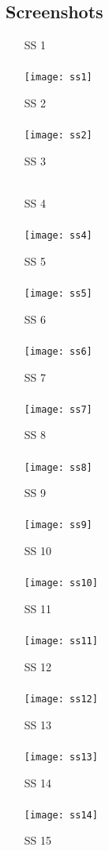 \documentclass[a4paper, 12pt, titlepage]{article}
\begin{document}
\subsection{Screenshots}
\begin{enumerate}
	\item[SS]1\\\\
		\texttt{[image: ss1]}
	\item[SS]2\\\\
		\texttt{[image: ss2]}
	\item[SS]3\\\\
	\item[SS]4\\\\ 
		\texttt{[image: ss4]}
	\item[SS]5\\\\ 
		\texttt{[image: ss5]}
	\item[SS]6\\\\
		\texttt{[image: ss6]}
	\item[SS]7\\\\ 
		\texttt{[image: ss7]}
	\item[SS]8\\\\ 
		\texttt{[image: ss8]}
	\item[SS]9\\\\ 
		\texttt{[image: ss9]}
	\item[SS]10\\\\ 
		\texttt{[image: ss10]}
	\item[SS]11\\\\ 
		\texttt{[image: ss11]}
	\item[SS]12\\\\ 
		\texttt{[image: ss12]}
	\item[SS]13\\\\ 
		\texttt{[image: ss13]}
	\item[SS]14\\\\ 
		\texttt{[image: ss14]}
	\item[SS]15\\\\ 

\end{enumerate}
\end{document}

